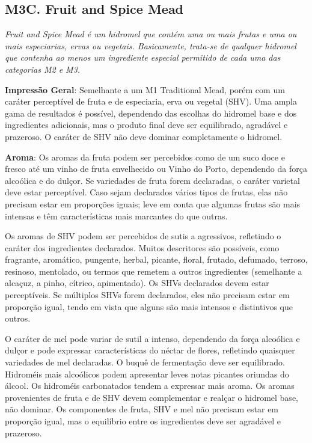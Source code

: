 \subsection*{M3C. Fruit and Spice Mead}

\textit{Fruit and Spice Mead é um hidromel que contém uma ou mais frutas e uma ou mais especiarias, ervas ou vegetais. Basicamente, trata-se de qualquer hidromel que contenha ao menos um ingrediente especial permitido de cada uma das categorias M2 e M3.}

\textbf{Impressão Geral}: Semelhante a um M1 Traditional Mead, porém com um caráter perceptível de fruta e de especiaria, erva ou vegetal (SHV). Uma ampla gama de resultados é possível, dependendo das escolhas do hidromel base e dos ingredientes adicionais, mas o produto final deve ser equilibrado, agradável e prazeroso. O caráter de SHV não deve dominar completamente o hidromel.

\textbf{Aroma}: Os aromas da fruta podem ser percebidos como de um suco doce e fresco até um vinho de fruta envelhecido ou Vinho do Porto, dependendo da força alcoólica e do dulçor. Se variedades de fruta forem declaradas, o caráter varietal deve estar perceptível. Caso sejam declarados vários tipos de frutas, elas não precisam estar em proporções iguais; leve em conta que algumas frutas são mais intensas e têm características mais marcantes do que outras.

Os aromas de SHV podem ser percebidos de sutis a agressivos, refletindo o caráter dos ingredientes declarados. Muitos descritores são possíveis, como fragrante, aromático, pungente, herbal, picante, floral, frutado, defumado, terroso, resinoso, mentolado, ou termos que remetem a outros ingredientes (semelhante a alcaçuz, a pinho, cítrico, apimentado). Os SHVs declarados devem estar perceptíveis. Se múltiplos SHVs forem declarados, eles não precisam estar em proporção igual, tendo em vista que alguns são mais intensos e distintivos que outros.

O caráter de mel pode variar de sutil a intenso, dependendo da força alcoólica e dulçor e pode expressar características do néctar de flores, refletindo quaisquer variedades de mel declaradas. O buquê de fermentação deve ser equilibrado. Hidroméis mais alcoólicos podem apresentar leves notas picantes oriundas do álcool. Os hidroméis carbonatados tendem a expressar mais aroma. Os aromas provenientes de fruta e de SHV devem complementar e realçar o hidromel base, não dominar. Os componentes de fruta, SHV e mel não precisam estar em proporção igual, mas o equilíbrio entre os ingredientes deve ser agradável e prazeroso.

